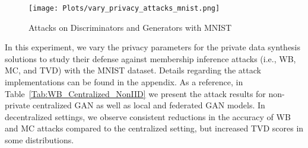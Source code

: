 \documentclass[conference]{IEEEtran}
\begin{document}



\begin{figure}
 \centering
 \texttt{[image: Plots/vary\_privacy\_attacks\_mnist.png]}
 \caption{Attacks on Discriminators and Generators with MNIST }
 \label{fig:varyNoiseWB_MC_TVD}
\end{figure}

In this experiment, we vary the privacy parameters for the private data synthesis solutions to study their defense against membership inference attacks (i.e., WB, MC, and TVD) with the MNIST dataset.  Details regarding the attack implementations can be found in the appendix.    { As a reference, in Table~\ref{Tab:WB_Centralized_NonIID} we present the attack results for non-private centralized GAN as well as local and federated GAN models. In decentralized settings, we observe consistent reductions in the accuracy of WB and MC attacks compared to the centralized setting, but increased TVD scores in some distributions. } 
\end{document}
